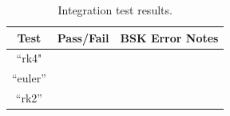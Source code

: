 \begin{table}[h]
	\caption{Integration test results.}
	\label{tbl:intResults}
	\centering \fontsize{10}{10}\selectfont
	\begin{tabular}{c | c | p{4in} } %
		\hline\hline
		\textbf{Test} 			& \textbf{Pass/Fail} 	 & \textbf{BSK Error Notes}
		\\ \hline
		``rk4"		  	&
		      	  &
		
		\\ \hline
		``euler''	   	           	&
		           		&      
		  
		\\ \hline
		``rk2''      	&
		
		&
		
		\\
		\hline\hline
	\end{tabular}
\end{table}
